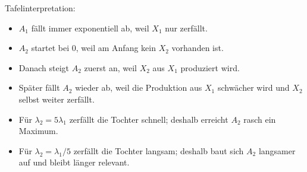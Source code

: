 \documentclass[11pt,a4paper]{scrartcl}
\begin{document}
\begin{enumerate}[label=(\alph*)]
            \begin{notebox}
                Tafelinterpretation:
                \begin{itemize}
                    \item $A_1$ fällt immer exponentiell ab, weil $X_1$ nur zerfällt.
                    \item $A_2$ startet bei $0$, weil am Anfang kein $X_2$ vorhanden ist.
                    \item Danach steigt $A_2$ zuerst an, weil $X_2$ aus $X_1$ produziert wird.
                    \item Später fällt $A_2$ wieder ab, weil die Produktion aus $X_1$ schwächer wird und $X_2$ selbst weiter zerfällt.
                    \item Für $\lambda_2=5\lambda_1$ zerfällt die Tochter schnell; deshalb erreicht $A_2$ rasch ein Maximum.
                    \item Für $\lambda_2=\lambda_1/5$ zerfällt die Tochter langsam; deshalb baut sich $A_2$ langsamer auf und bleibt länger relevant.
                \end{itemize}
            \end{notebox}

    \end{enumerate}
\end{document}
